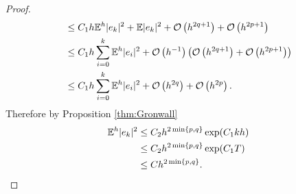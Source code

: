 \begin{proof}
\begin{align}
	&\leq C_1 h \mathbb{E}^h|e_k|^2 + \mathbb{E}|e_k|^2 + \mathcal{O}\left(h^{2q + 1}\right) + \mathcal{O}\left(h^{2p + 1}\right) \\
	&\leq C_1 h \sum_{i = 0}^{k}\mathbb{E}^h|e_i|^2 + \mathcal{O}\left(h^{-1}\right)\left(\mathcal{O}\left(h^{2q + 1}\right) + \mathcal{O}\left(h^{2p + 1}\right)\right)\\
	&\leq C_1 h \sum_{i = 0}^{k}\mathbb{E}^h|e_i|^2 + \mathcal{O}\left(h^{2q}\right) + \mathcal{O}\left(h^{2p}\right).
\end{align}
Therefore by Proposition \ref{thm:Gronwall}
\begin{align}
	\mathbb{E}^h|e_{k}|^2 &\leq C_2 h^{2\min\{p,q\}} \exp(C_1kh)\\ 
		      &\leq C_2 h^{2\min\{p,q\}} \exp(C_1T) \\	
		      &\leq Ch^{2\min\{p,q\}}.	
\end{align}  	
\end{proof}